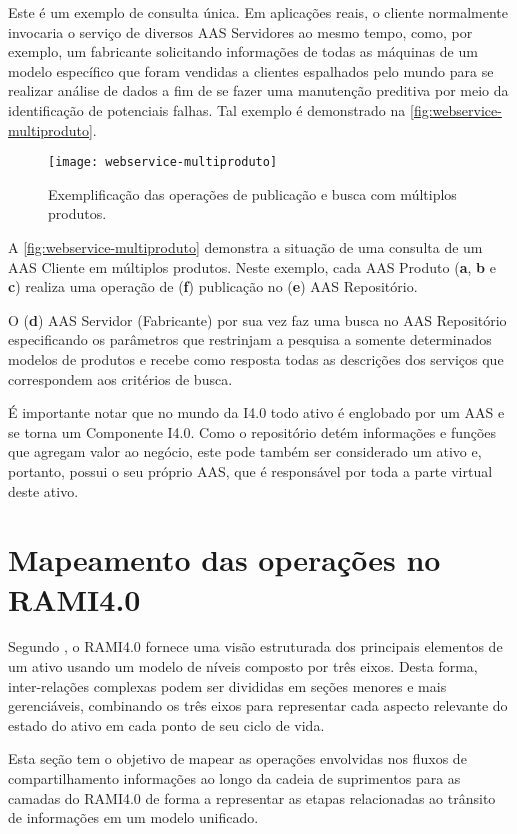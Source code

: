 	Este é um exemplo de consulta única. Em aplicações reais, o cliente normalmente invocaria o serviço de diversos AAS Servidores ao mesmo tempo, como, por exemplo, um fabricante solicitando informações de todas as máquinas de um modelo específico que foram vendidas a clientes espalhados pelo mundo para se realizar análise de dados a fim de se fazer uma manutenção preditiva por meio da identificação de potenciais falhas. Tal exemplo é demonstrado na \autoref{fig:webservice-multiproduto}.
	
	\begin{figure}[htb]
		\centering
		\caption{Exemplificação das operações de publicação e busca com múltiplos produtos.}
		\label{fig:webservice-multiproduto}
		\texttt{[image: webservice-multiproduto]}
	\end{figure}
	
	A \autoref{fig:webservice-multiproduto} demonstra a situação de uma consulta de um AAS Cliente em múltiplos produtos. Neste exemplo, cada AAS Produto (\textbf{a}, \textbf{b} e \textbf{c}) realiza uma operação de (\textbf{f}) publicação no (\textbf{e}) AAS Repositório. 
	
	O (\textbf{d}) AAS Servidor (Fabricante) por sua vez faz uma busca no AAS Repositório especificando os parâmetros que restrinjam a pesquisa a somente determinados modelos de produtos e recebe como resposta todas as descrições dos serviços que correspondem aos critérios de busca.
	
	É importante notar que no mundo da I4.0 todo ativo é englobado por um AAS e se torna um Componente I4.0. Como o repositório detém informações e funções que agregam valor ao negócio, este pode também ser considerado um ativo e, portanto, possui o seu próprio AAS, que é responsável por toda a parte virtual deste ativo.
	
\section{Mapeamento das operações no RAMI4.0}
	
	Segundo , o RAMI4.0 fornece uma visão estruturada dos principais elementos de um ativo usando um modelo de níveis composto por três eixos. Desta forma, inter-relações complexas podem ser divididas em seções menores e mais gerenciáveis, combinando os três eixos para representar cada aspecto relevante do estado do ativo em cada ponto de seu ciclo de vida.
	
	Esta seção tem o objetivo de mapear as operações envolvidas nos fluxos de compartilhamento informações ao longo da cadeia de suprimentos para as camadas do RAMI4.0 de forma a representar as etapas relacionadas ao trânsito de informações em um modelo unificado.
	
